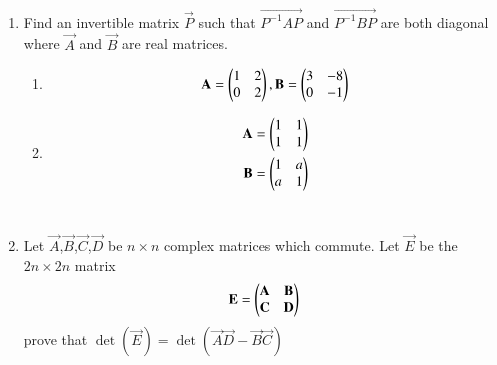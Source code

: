 \renewcommand{\theequation}{\theenumi}
\renewcommand{\thefigure}{\theenumi}
\begin{enumerate}[label=\thesubsection.\arabic*.,ref=\thesubsection.\theenumi]

\item Find an invertible matrix $\vec{P}$ such that $\vec{P^{-1}AP}$ and $\vec{P^{-1}BP}$ are both diagonal where $\vec{A}$ and $\vec{B}$ are real matrices.
%
\begin{enumerate}
\item 
\begin{align}
\Vec{A}=\myvec{1&2\\0&2} , \Vec{B}=\myvec{3&-8\\0&-1}
    \end{align}
\solution

\twocolumn
\item %
\begin{align}
    \Vec{A}=\myvec{1&1\\1&1}\\ 
    \vec{B}=\myvec{1&a\\a&1}
\end{align}
%
\\
\solution

\twocolumn
\end{enumerate}
\item %
Let $\vec{A}$,$\vec{B}$,$\vec{C}$,$\vec{D}$ be $n\times n$ complex matrices which commute. Let $\vec{E}$ be the $2n\times 2n$ matrix
\begin{align}
    \mathbf{E}=\begin{pmatrix}\mathbf{A} & \mathbf{B}\\\mathbf{C} & \mathbf{D}\end{pmatrix}\label{eq:solutions/6/5/4/E}
\end{align}
prove that $\det(\vec{E})=\det(\vec{A}\vec{D}-\vec{B}\vec{C})$
%
\\
\solution

\end{enumerate}

